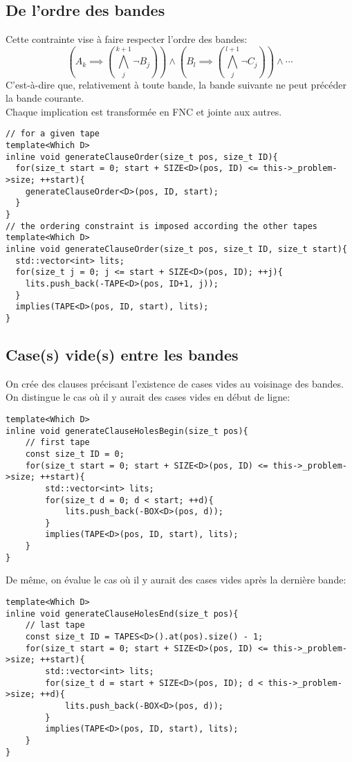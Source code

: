 \documentclass[a4paper,12pt]{report}
\begin{document}
\subsection{De l'ordre des bandes}

Cette contrainte vise à faire respecter l'ordre des bandes:
$$\left(A_k \implies \left( \bigwedge_{j}^{k+1} \lnot B_j \right)\right)\wedge \left( B_l \implies \left( \bigwedge_{j}^{l+1} \lnot C_j \right)\right)\wedge \cdots$$
C'est-à-dire que, relativement à toute bande,  la bande suivante ne peut précéder la bande courante.\\
Chaque implication est transformée en FNC et jointe aux autres.
\lstset{style=Cpp, caption=Respect de l'ordre, label=C:order}
\begin{lstlisting}[mathescape=true]
// for a given tape
template<Which D>
inline void generateClauseOrder(size_t pos, size_t ID){
  for(size_t start = 0; start + SIZE<D>(pos, ID) <= this->_problem->size; ++start){
    generateClauseOrder<D>(pos, ID, start);	
  }
}
// the ordering constraint is imposed according the other tapes
template<Which D>
inline void generateClauseOrder(size_t pos, size_t ID, size_t start){
  std::vector<int> lits;
  for(size_t j = 0; j <= start + SIZE<D>(pos, ID); ++j){
    lits.push_back(-TAPE<D>(pos, ID+1, j));
  }
  implies(TAPE<D>(pos, ID, start), lits);
}
\end{lstlisting}

\subsection{Case(s) vide(s) entre les bandes}
On crée des clauses précisant l'existence de cases vides au voisinage des bandes.\\
On distingue le cas où il y aurait des cases vides en début de ligne:
\begin{lstlisting}[mathescape=true]
template<Which D>
inline void generateClauseHolesBegin(size_t pos){
	// first tape	
	const size_t ID = 0;
	for(size_t start = 0; start + SIZE<D>(pos, ID) <= this->_problem->size; ++start){
		std::vector<int> lits;
		for(size_t d = 0; d < start; ++d){
			lits.push_back(-BOX<D>(pos, d));
		}
		implies(TAPE<D>(pos, ID, start), lits);	
	}
}
\end{lstlisting}
De même, on évalue le cas où il y aurait des cases vides après la dernière bande:
\lstset{style=Cpp, caption=Cases vides après la dernière bande, label=C:HoleEnd}
\begin{lstlisting}[mathescape=true]
template<Which D>
inline void generateClauseHolesEnd(size_t pos){
	// last tape
	const size_t ID = TAPES<D>().at(pos).size() - 1;
	for(size_t start = 0; start + SIZE<D>(pos, ID) <= this->_problem->size; ++start){
		std::vector<int> lits;
		for(size_t d = start + SIZE<D>(pos, ID); d < this->_problem->size; ++d){
			lits.push_back(-BOX<D>(pos, d));
		}
		implies(TAPE<D>(pos, ID, start), lits);	
	}
}
\end{lstlisting}
\end{document}
